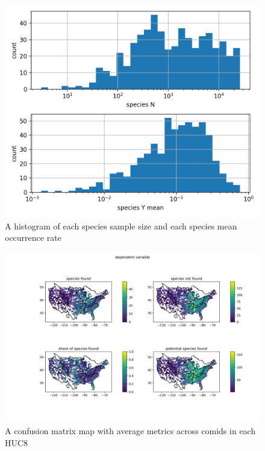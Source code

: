 \documentclass[]{article}
\begin{document}
\begin{figure}
	\includegraphics[width=\linewidth]{basic_histogram_log.png}
	\caption{A histogram of  each species sample size and each species mean occurrence rate}
	\label{fig:hist_n_y}
\end{figure}


\begin{figure}
	\includegraphics[width=\linewidth]{y01_huc8.png}
	\caption{A confusion matrix map with average metrics across comids in each HUC8}
	\label{fig:y01}
\end{figure}
\end{document}
